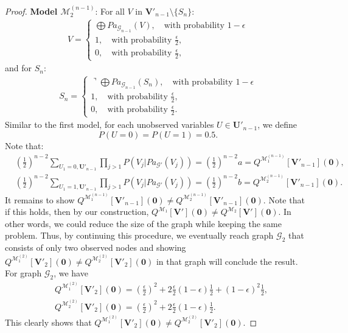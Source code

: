 \documentclass[accepted]{uai2022}
\newcommand{\Pa}[2]{\textit{Pa}_{#2}(#1)}
\newcommand{\V}[0]{\mathbf{V}}
\newcommand{\U}[0]{\mathbf{U}}
\newcommand{\G}[0]{\mathcal{G}}
\newcommand{\M}[0]{\mathcal{M}}
\begin{document}
\begin{proof}
        \textbf{Model $\M_2^{(n-1)}$}:
        For all $V$ in $\V'_{n-1}\setminus \{S_{n}\}$:
        \begin{align}
            V = 
            \begin{cases}
                \bigoplus \Pa{V}{\G_{n-1}}, \quad \text{with probability } 1-\epsilon \\
                1, \quad \text{with probability } \frac{\epsilon}{2},\\
                0, \quad \text{with probability } \frac{\epsilon}{2},
            \end{cases}
        \end{align}
        and for $S_{n}$:
        \begin{align}
            S_n = 
            \begin{cases}
                \urcorner\bigoplus \Pa{S_{n}}{\G_{n-1}}, \quad \text{with probability } 1-\epsilon \\
                1, \quad \text{with probability } \frac{\epsilon}{2},\\
                0, \quad \text{with probability } \frac{\epsilon}{2}.
            \end{cases}
        \end{align}
        Similar to the first model, for each unobserved variables $U\in\U'_{n-1}$, we define
        \begin{equation*}
            P(U=0)= P(U=1) = 0.5.
        \end{equation*}
        Note that:
        \begin{align*}
            & \left( \frac{1}{2} \right)^{n-2}\sum_{U_1=0, \U'_{n-1}} \prod_{j>1}P(V_j|\Pa{V_j}{\G'}) =   \left( \frac{1}{2} \right)^{n-2}a = Q^{\M_1^{(n-1)}}[\V'_{n-1}](\mathbf{0}),\\
            & \left( \frac{1}{2} \right)^{n-2}\sum_{U_1=1, \U'_{n-1}} \prod_{j>1}P(V_j|\Pa{V_j}{\G'}) =   \left( \frac{1}{2} \right)^{n-2}b =   Q^{\M_2^{(n-1)}}[\V'_{n-1}](\mathbf{0}).
        \end{align*}
        It remains to show  $Q^{\M_1^{(n-1)}}[\V'_{n-1}](\mathbf{0})\neq Q^{\M_2^{(n-1)}}[\V'_{n-1}](\mathbf{0})$. 
        Note that if this holds, then by our construction, $Q^{\M_1}[\V'](\mathbf{0})\neq Q^{\M_2}[\V'](\mathbf{0})$.
        In other words, we could reduce the size of the graph while keeping the same problem. Thus, by continuing this procedure, we eventually reach graph $\G_2$ that consists of only two observed nodes and showing $Q^{\M_1^{(2)}}[\V'_{2}](\mathbf{0})\neq Q^{\M_2^{(2)}}[\V'_{2}](\mathbf{0})$ in that graph will conclude the result.
        For graph $\G_2$, we have
        \begin{align*}
            & Q^{\M_1^{(2)}}[\V'_{2}](\mathbf{0}) =\left( \frac{\epsilon}{2}\right)^2 + 2\frac{\epsilon}{2}(1-\epsilon)\frac{1}{2}+(1-\epsilon)^2\frac{1}{2}, \\
            & Q^{\M_2^{(2)}}[\V'_{2}](\mathbf{0}) = \left( \frac{\epsilon}{2}\right)^2 + 2\frac{\epsilon}{2}(1-\epsilon)\frac{1}{2}.
        \end{align*}
        This clearly shows that $Q^{\M_1^{(2)}}[\V'_{2}](\mathbf{0})\neq Q^{\M_2^{(2)}}[\V'_{2}](\mathbf{0})$.
    \end{proof}%
\end{document}
